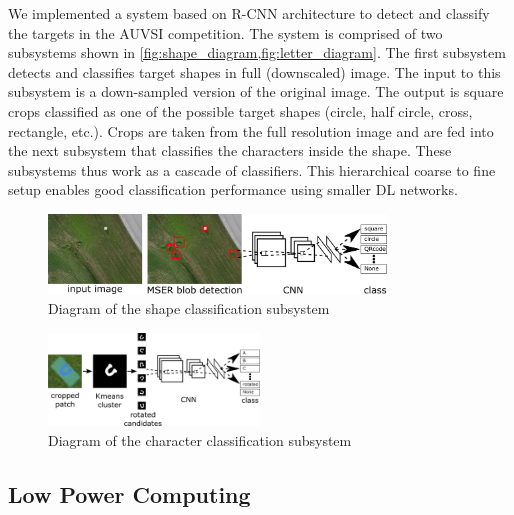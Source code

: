 \documentclass{article} %
\begin{document}
We implemented a system based on R-CNN architecture to detect and classify the
targets in the AUVSI competition. The system is comprised of two subsystems shown in \cref{fig:shape_diagram,fig:letter_diagram}.
The first subsystem detects and classifies target shapes in full (downscaled) image. The
input to this subsystem is a down-sampled version of the original image. The output is square crops classified as one of the possible target shapes (circle, half circle, cross, rectangle, etc.). Crops are taken from the full resolution
image and are fed into the
next subsystem that classifies the characters inside the shape. These subsystems
thus work as a cascade of classifiers. This hierarchical coarse to fine setup enables good classification performance using smaller DL networks.
\begin{figure}[h]
	\centering
	\includegraphics[width=0.8\textwidth]{diagram}
	\caption{Diagram of the shape classification subsystem}
	\label{fig:shape_diagram}
\end{figure}
\begin{figure}[h]
	\centering
	\includegraphics[width=0.5\textwidth]{letter_diagram}
	\caption{Diagram of the character classification subsystem}
	\label{fig:letter_diagram}
\end{figure}

\subsection{Low Power Computing}
\end{document}
